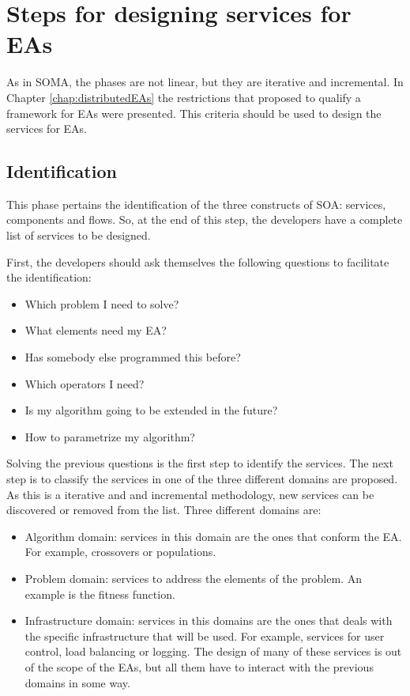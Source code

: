 

\section{Steps for designing services for EAs}

 As in SOMA, the phases are not linear, but they are iterative and incremental. In Chapter \ref{chap:distributedEAs} the restrictions that  proposed to qualify a framework for EAs were presented. This criteria should be used to design the services for EAs.

\subsection{Identification}
\label{subsec:soaea:identification}
This phase pertains the identification of the three constructs of SOA: services, components and flows. So, at the end of this step, the developers have a complete list of services to be designed.

First, the developers should ask themselves the following questions to facilitate the identification:
\begin{itemize}
\item Which problem I need to solve?
\item What elements need my EA?
\item Has somebody else programmed this before?
\item Which operators I need?
\item Is my algorithm going to be extended in the future?
\item How to parametrize my algorithm?
\end{itemize}

Solving the previous questions is the first step to identify the services. The next step is to classify the services in one of the three different domains are proposed. As this is a iterative and and incremental methodology, new services can be discovered or removed from the list. Three different domains are:

\begin{itemize}
\item Algorithm domain: services in this domain are the ones that conform the EA. For example, crossovers or populations.
\item Problem domain: services to address the elements of the problem. An example is the fitness function.
\item Infrastructure domain: services in this domains are the ones that deals with the specific infrastructure that will be used. For example, services for user control, load balancing or logging. The design of many of these services is out of the scope of the EAs, but all them have to interact with the previous domains in some way.
\end{itemize}

